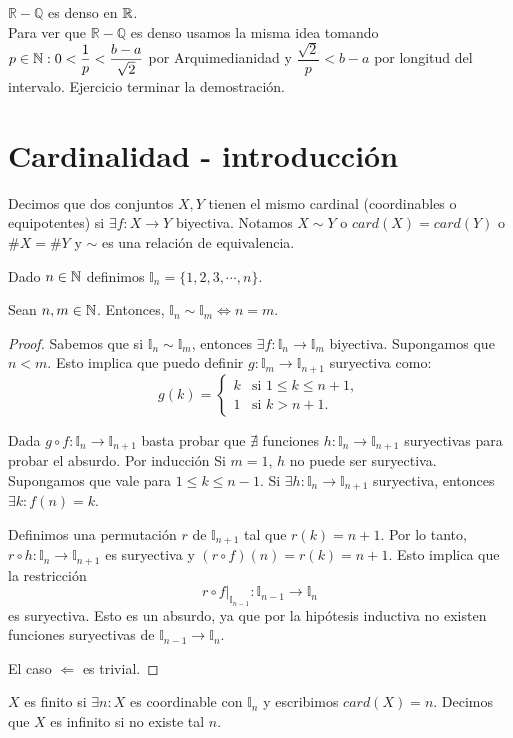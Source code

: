 \begin{eg}
    $\mathbb{R-Q}$ es denso en $\mathbb{R}$. \\
    Para ver que $\mathbb{R-Q}$ es denso usamos la misma idea tomando $p \in \mathbb{N} :0<\dfrac1p<\dfrac{b-a}{\sqrt2}$ por Arquimedianidad y $\dfrac{\sqrt2}{p} < b-a$ por longitud del intervalo.
    Ejercicio terminar la demostración.
\end{eg}

\section{Cardinalidad - introducción}

\begin{definition}
    Decimos que dos conjuntos $X, Y$ tienen el mismo cardinal (coordinables o equipotentes) si $\exists f: X \to Y$ biyectiva. Notamos $X \sim Y$ o $card(X) = card(Y)$ o $\#X=\#Y$ y $\sim$ es una relación de equivalencia.
\end{definition}

Dado $n \in \mathbb{N}$ definimos $\mathbb{I}_n = \{1, 2, 3,\cdots, n\}$.

\begin{theorem}
    Sean $n, m \in \mathbb{N}$. Entonces, $\mathbb{I}_n \sim \mathbb{I}_m \iff n = m$.
    \begin{proof}
        Sabemos que si $\mathbb{I}_n \sim \mathbb{I}_m$, entonces $\exists f: \mathbb{I}_n \to \mathbb{I}_m$ biyectiva. Supongamos que $n < m$. Esto implica que puedo definir $g: \mathbb{I}_m \to \mathbb{I}_{n+1}$ suryectiva como:
        \begin{equation}
            g(k) =
            \begin{cases}
                k & \text{si } 1 \leq k \leq n+1, \\
                1 & \text{si } k > n+1.
            \end{cases}
        \end{equation}

        Dada $g \circ f: \mathbb{I}_n \to \mathbb{I}_{n+1}$ basta probar que $\nexists$ funciones $h: \mathbb{I}_n \to \mathbb{I}_{n+1}$ suryectivas para probar el absurdo. Por inducción
        Si $m = 1$, $h$ no puede ser suryectiva. Supongamos que vale para $1 \leq k \leq n-1$. Si $\exists h: \mathbb{I}_n \to \mathbb{I}_{n+1}$ suryectiva, entonces $\exists k : f(n) = k$.

        Definimos una permutación $r$ de $\mathbb{I}_{n+1}$ tal que $r(k) = n+1$. Por lo tanto, $r \circ h: \mathbb{I}_n \to \mathbb{I}_{n+1}$ es suryectiva y $(r \circ f)(n) = r(k) = n+1$. Esto implica que la restricción
        \[
            r \circ f|_{\mathbb{I}_{n-1}} : \mathbb{I}_{n-1} \to \mathbb{I}_n
        \]
        es suryectiva. Esto es un absurdo, ya que por la hipótesis inductiva no existen funciones suryectivas de $\mathbb{I}_{n-1} \to \mathbb{I}_n$.

        El caso $\Leftarrow$ es trivial.
    \end{proof}
\end{theorem}

\begin{definition}
    $X$ es finito si $\exists n: X$ es coordinable con $\mathbb{I}_n$ y escribimos $card(X)=n$. Decimos que $X$ es infinito si no existe tal $n$.
\end{definition}
